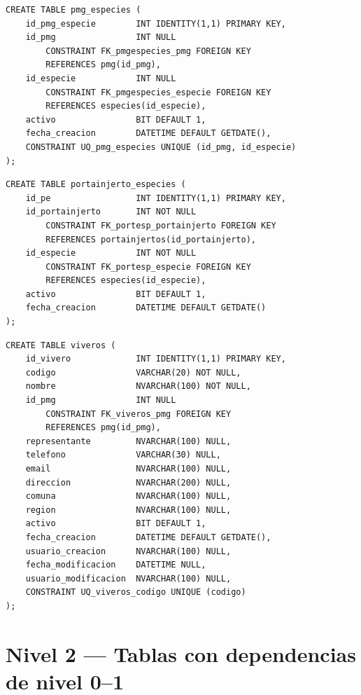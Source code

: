 \documentclass[12pt,a4paper,twoside]{report}
\begin{document}
\begin{lstlisting}[style=sqlstyle, caption={pmg\_especies}]
CREATE TABLE pmg_especies (
    id_pmg_especie        INT IDENTITY(1,1) PRIMARY KEY,
    id_pmg                INT NULL
        CONSTRAINT FK_pmgespecies_pmg FOREIGN KEY
        REFERENCES pmg(id_pmg),
    id_especie            INT NULL
        CONSTRAINT FK_pmgespecies_especie FOREIGN KEY
        REFERENCES especies(id_especie),
    activo                BIT DEFAULT 1,
    fecha_creacion        DATETIME DEFAULT GETDATE(),
    CONSTRAINT UQ_pmg_especies UNIQUE (id_pmg, id_especie)
);
\end{lstlisting}

\begin{lstlisting}[style=sqlstyle, caption={portainjerto\_especies}]
CREATE TABLE portainjerto_especies (
    id_pe                 INT IDENTITY(1,1) PRIMARY KEY,
    id_portainjerto       INT NOT NULL
        CONSTRAINT FK_portesp_portainjerto FOREIGN KEY
        REFERENCES portainjertos(id_portainjerto),
    id_especie            INT NOT NULL
        CONSTRAINT FK_portesp_especie FOREIGN KEY
        REFERENCES especies(id_especie),
    activo                BIT DEFAULT 1,
    fecha_creacion        DATETIME DEFAULT GETDATE()
);
\end{lstlisting}

\begin{lstlisting}[style=sqlstyle, caption={viveros}]
CREATE TABLE viveros (
    id_vivero             INT IDENTITY(1,1) PRIMARY KEY,
    codigo                VARCHAR(20) NOT NULL,
    nombre                NVARCHAR(100) NOT NULL,
    id_pmg                INT NULL
        CONSTRAINT FK_viveros_pmg FOREIGN KEY
        REFERENCES pmg(id_pmg),
    representante         NVARCHAR(100) NULL,
    telefono              VARCHAR(30) NULL,
    email                 NVARCHAR(100) NULL,
    direccion             NVARCHAR(200) NULL,
    comuna                NVARCHAR(100) NULL,
    region                NVARCHAR(100) NULL,
    activo                BIT DEFAULT 1,
    fecha_creacion        DATETIME DEFAULT GETDATE(),
    usuario_creacion      NVARCHAR(100) NULL,
    fecha_modificacion    DATETIME NULL,
    usuario_modificacion  NVARCHAR(100) NULL,
    CONSTRAINT UQ_viveros_codigo UNIQUE (codigo)
);
\end{lstlisting}

\section{Nivel 2 --- Tablas con dependencias de nivel 0--1}
\end{document}

